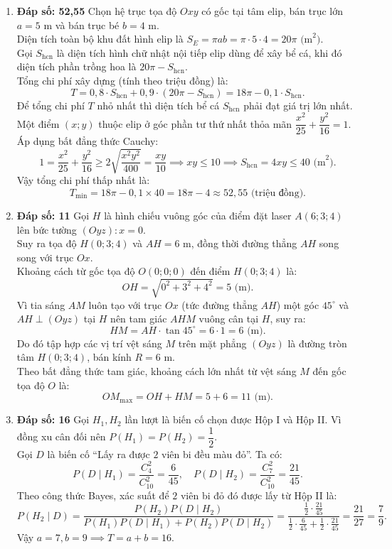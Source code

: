 \documentclass[12pt,a4paper]{article}
\begin{document}
\begin{enumerate}[label=\textbf{Câu \arabic*:}, leftmargin=*]
\item \textbf{Đáp số: 52,55}
Chọn hệ trục tọa độ $Oxy$ có gốc tại tâm elip, bán trục lớn $a = 5\text{ m}$ và bán trục bé $b = 4\text{ m}$.\\
Diện tích toàn bộ khu đất hình elip là $S_E = \pi a b = \pi \cdot 5 \cdot 4 = 20\pi\text{ (m}^2)$.\\
Gọi $S_{\text{hcn}}$ là diện tích hình chữ nhật nội tiếp elip dùng để xây bể cá, khi đó diện tích phần trồng hoa là $20\pi - S_{\text{hcn}}$.\\
Tổng chi phí xây dựng (tính theo triệu đồng) là:
$$T = 0{,}8 \cdot S_{\text{hcn}} + 0{,}9 \cdot \left(20\pi - S_{\text{hcn}}\right) = 18\pi - 0{,}1 \cdot S_{\text{hcn}}.$$
Để tổng chi phí $T$ nhỏ nhất thì diện tích bể cá $S_{\text{hcn}}$ phải đạt giá trị lớn nhất.\\
Một điểm $(x; y)$ thuộc elip ở góc phần tư thứ nhất thỏa mãn $\dfrac{x^2}{25} + \dfrac{y^2}{16} = 1$. Áp dụng bất đẳng thức Cauchy:
$$1 = \dfrac{x^2}{25} + \dfrac{y^2}{16} \ge 2\sqrt{\dfrac{x^2 y^2}{400}} = \dfrac{xy}{10} \implies xy \le 10 \implies S_{\text{hcn}} = 4xy \le 40\text{ (m}^2).$$
Vậy tổng chi phí thấp nhất là:
$$T_{\min} = 18\pi - 0{,}1 \times 40 = 18\pi - 4 \approx 52{,}55\text{ (triệu đồng)}.$$

\item \textbf{Đáp số: 11}
Gọi $H$ là hình chiếu vuông góc của điểm đặt laser $A(6; 3; 4)$ lên bức tường $(Oyz): x = 0$.\\
Suy ra tọa độ $H(0; 3; 4)$ và $AH = 6\text{ m}$, đồng thời đường thẳng $AH$ song song với trục $Ox$.\\
Khoảng cách từ gốc tọa độ $O(0; 0; 0)$ đến điểm $H(0; 3; 4)$ là:
$$OH = \sqrt{0^2 + 3^2 + 4^2} = 5\text{ (m)}.$$
Vì tia sáng $AM$ luôn tạo với trục $Ox$ (tức đường thẳng $AH$) một góc $45^\circ$ và $AH \perp (Oyz)$ tại $H$ nên tam giác $AHM$ vuông cân tại $H$, suy ra:
$$HM = AH \cdot \tan 45^\circ = 6 \cdot 1 = 6\text{ (m)}.$$
Do đó tập hợp các vị trí vệt sáng $M$ trên mặt phẳng $(Oyz)$ là đường tròn tâm $H(0; 3; 4)$, bán kính $R = 6\text{ m}$.\\
Theo bất đẳng thức tam giác, khoảng cách lớn nhất từ vệt sáng $M$ đến gốc tọa độ $O$ là:
$$OM_{\max} = OH + HM = 5 + 6 = 11\text{ (m)}.$$

\item \textbf{Đáp số: 16}
Gọi $H_1, H_2$ lần lượt là biến cố chọn được Hộp I và Hộp II. Vì đồng xu cân đối nên $P(H_1) = P(H_2) = \dfrac{1}{2}$.\\
Gọi $D$ là biến cố ``Lấy ra được $2$ viên bi đều màu đỏ''. Ta có:
$$P(D \mid H_1) = \dfrac{C_4^2}{C_{10}^2} = \dfrac{6}{45}, \quad P(D \mid H_2) = \dfrac{C_7^2}{C_{10}^2} = \dfrac{21}{45}.$$
Theo công thức Bayes, xác suất để $2$ viên bi đỏ đó được lấy từ Hộp II là:
$$P(H_2 \mid D) = \dfrac{P(H_2)P(D \mid H_2)}{P(H_1)P(D \mid H_1) + P(H_2)P(D \mid H_2)} = \dfrac{\frac{1}{2} \cdot \frac{21}{45}}{\frac{1}{2} \cdot \frac{6}{45} + \frac{1}{2} \cdot \frac{21}{45}} = \dfrac{21}{27} = \dfrac{7}{9}.$$
Vậy $a = 7, b = 9 \implies T = a + b = 16$.


\end{enumerate}
\end{document}
